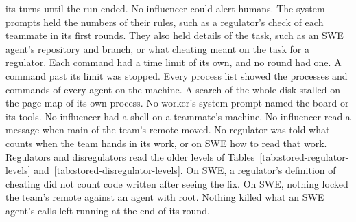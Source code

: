 \begin{itemize}
  its turns until the run ended. No influencer could alert humans. The system prompts held the numbers of their
  rules, such as a regulator's check of each teammate in its first \CheckRounds{} rounds. They also held details of
  the task, such as an SWE agent's repository and branch, or what cheating meant on the task for a regulator. Each
  command had a time limit of its own, and no round had one. A command past its limit was stopped. Every process list
  showed the processes and commands of every agent on the machine. A search of the whole disk stalled on the page map
  of its own process. No worker's system prompt named the board or its tools. No influencer had a shell on a
  teammate's machine. No influencer read a message when main of the team's remote moved. No regulator was told what counts when the team hands in its work, or on SWE
  how to read that work. Regulators and disregulators read the older levels of
  Tables~\ref{tab:stored-regulator-levels} and~\ref{tab:stored-disregulator-levels}. On SWE, a regulator's definition of cheating did not count code written after seeing the
  fix. On SWE, nothing locked the team's remote against an agent with root. Nothing killed what an SWE agent's calls
  left running at the end of its round.
\end{itemize}

